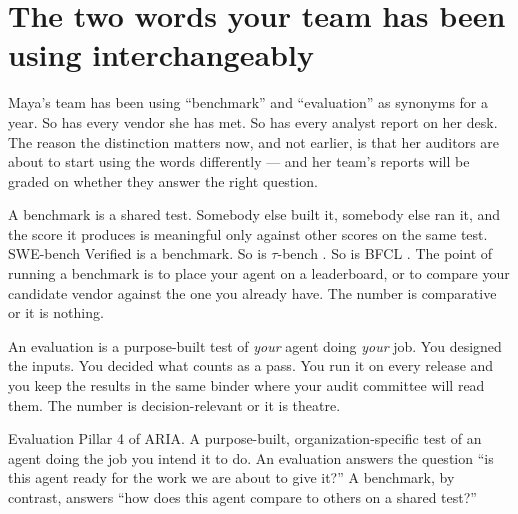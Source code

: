 \label{ch:40-evaluation-13-vs-benchmarking}

\starttwocol

\section{The two words your team has been using interchangeably}

Maya's team has been using ``benchmark'' and ``evaluation'' as synonyms for a year. So has every vendor she has met. So has every analyst report on her desk. The reason the distinction matters now, and not earlier, is that her auditors are about to start using the words differently --- and her team's reports will be graded on whether they answer the right question.

A benchmark is a shared test. Somebody else built it, somebody else ran it, and the score it produces is meaningful only against other scores on the same test. SWE-bench Verified \citep{jimenez2024swebench, openai-swebench-verified-2024} is a benchmark. So is $\tau$-bench \citep{yao2024taubench}. So is BFCL \citep{bfcl-2024}. The point of running a benchmark is to place your agent on a leaderboard, or to compare your candidate vendor against the one you already have. The number is comparative or it is nothing.

An evaluation is a purpose-built test of \textit{your} agent doing \textit{your} job. You designed the inputs. You decided what counts as a pass. You run it on every release and you keep the results in the same binder where your audit committee will read them. The number is decision-relevant or it is theatre.

\begin{TNdefinition}{Evaluation}
Pillar 4 of ARIA. A purpose-built, organization-specific test of an agent doing the job you intend it to do. An evaluation answers the question ``is this agent ready for the work we are about to give it?'' A benchmark, by contrast, answers ``how does this agent compare to others on a shared test?''
\end{TNdefinition}

